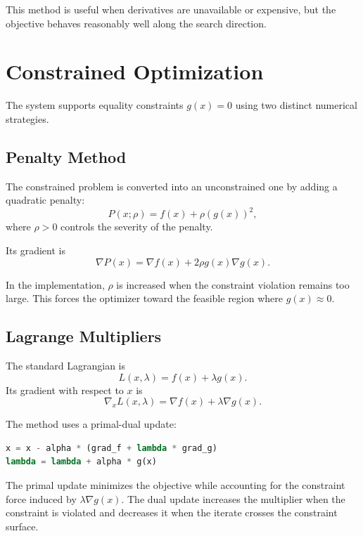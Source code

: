 \documentclass[12pt,a4paper]{report}
\begin{document}
This method is useful when derivatives are unavailable or expensive, but the objective behaves reasonably well along the search direction.

\chapter{Constrained Optimization}

The system supports equality constraints $g(x)=0$ using two distinct numerical strategies.

\section{Penalty Method}

The constrained problem is converted into an unconstrained one by adding a quadratic penalty:
\begin{equation}
P(x;\rho) = f(x) + \rho (g(x))^2,
\end{equation}
where $\rho > 0$ controls the severity of the penalty.

Its gradient is
\begin{equation}
\nabla P(x) = \nabla f(x) + 2\rho g(x)\nabla g(x).
\end{equation}

In the implementation, $\rho$ is increased when the constraint violation remains too large. This forces the optimizer toward the feasible region where $g(x)\approx 0$.

\section{Lagrange Multipliers}

The standard Lagrangian is
\begin{equation}
L(x,\lambda) = f(x) + \lambda g(x).
\end{equation}
Its gradient with respect to $x$ is
\begin{equation}
\nabla_x L(x,\lambda) = \nabla f(x) + \lambda \nabla g(x).
\end{equation}

The method uses a primal-dual update:
\begin{lstlisting}[language=Python]
x = x - alpha * (grad_f + lambda * grad_g)
lambda = lambda + alpha * g(x)
\end{lstlisting}

The primal update minimizes the objective while accounting for the constraint force induced by $\lambda \nabla g(x)$. The dual update increases the multiplier when the constraint is violated and decreases it when the iterate crosses the constraint surface.
\end{document}
